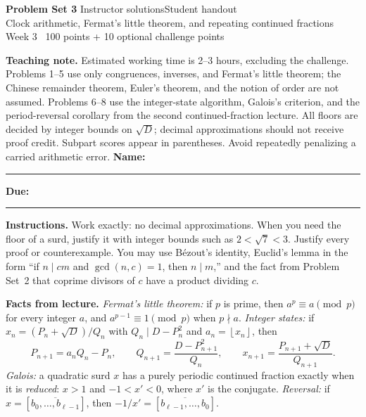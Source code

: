 \documentclass[11pt,letterpaper]{article}
\newcommand{\floor}[1]{\left\lfloor #1\right\rfloor}
\newcommand{\per}[1]{\overline{#1}}
\newcommand{\edition}{\ifsolutions Instructor solutions\else Student handout\fi}
\newcommand{\topic}[1]{\par\addvspace{9pt}\Needspace{10\baselineskip}{\large\bfseries\color{teal}#1}\par\nobreak}
\begin{document}
{\LARGE\bfseries\color{navy}Problem Set 3}\hfill
{\small\color{teal}\edition}\\[4pt]
{\large Clock arithmetic, Fermat's little theorem, and repeating continued fractions}\\[4pt]
{\small\color{muted}Week 3 \textbar\ 100 points + 10 optional challenge points}

\ifsolutions
\medskip
\textbf{Teaching note.} Estimated working time is 2--3 hours, excluding the
challenge. Problems 1--5 use only congruences, inverses, and Fermat's little
theorem; the Chinese remainder theorem, Euler's theorem, and the notion of
order are not assumed. Problems 6--8 use the integer-state algorithm, Galois's
criterion, and the period-reversal corollary from the second continued-fraction
lecture. All floors are decided by integer bounds on $\sqrt D$; decimal
approximations should not receive proof credit. Subpart scores appear in
parentheses. Avoid repeatedly penalizing a carried arithmetic error.
\else
\medskip
\textbf{Name:}\ \rule{0.46\linewidth}{0.4pt}\hfill
\textbf{Due:}\ \rule{0.20\linewidth}{0.4pt}
\fi

\medskip
\textbf{Instructions.} Work exactly: no decimal approximations. When you need
the floor of a surd, justify it with integer bounds such as $2<\sqrt7<3$.
Justify every proof or counterexample. You may use B\'ezout's identity,
Euclid's lemma in the form ``if $n\mid cm$ and $\gcd(n,c)=1$, then $n\mid m$,''
and the fact from Problem Set~2 that coprime divisors of $c$ have a product
dividing $c$.

\textbf{Facts from lecture.} \emph{Fermat's little theorem:} if $p$ is prime,
then $a^p\equiv a\pmod p$ for every integer $a$, and
$a^{p-1}\equiv1\pmod p$ when $p\nmid a$.
\emph{Integer states:} if $x_n=(P_n+\sqrt D)/Q_n$ with
$Q_n\mid D-P_n^2$ and $a_n=\floor{x_n}$, then
\[
  P_{n+1}=a_nQ_n-P_n,\qquad Q_{n+1}=\frac{D-P_{n+1}^2}{Q_n},
  \qquad x_{n+1}=\frac{P_{n+1}+\sqrt D}{Q_{n+1}}.
\]
\emph{Galois:} a quadratic surd $x$ has a purely periodic continued fraction
exactly when it is \emph{reduced}: $x>1$ and $-1<x'<0$, where $x'$ is the
conjugate. \emph{Reversal:} if $x=[\per{b_0,\ldots,b_{\ell-1}}]$, then
$-1/x'=[\per{b_{\ell-1},\ldots,b_0}]$.

\topic{I. Congruences and inverses}
\end{document}
